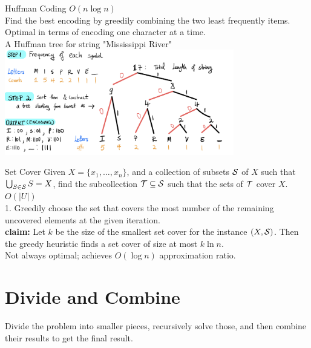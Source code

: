 \documentclass[10pt,a4paper]{article}
\begin{document}
\begin{multicols}{3}
\begin{textbox}{Huffman Coding}
      $O(n\log n)$ \\
    Find the best encoding by greedily combining the two least frequently items. Optimal in terms of encoding one character at a time.\\
    \linebreak
     A Huffman tree for string  "Mississippi River"\\
    \includegraphics[width=0.75\textwidth]{images/Huffman-coding.jpeg}
\end{textbox}

\begin{textbox}{Set Cover}
    Given $X = \{x_1,\ldots,x_n\}$, and a collection of subsets $\cal{S}$ of $X$ such
    that $\bigcup_{S \in \cal{S}} S = X$, find the subcollection $\cal{T} \subseteq \cal{S}$ such that the sets of
    $\cal{T}$ cover $X$.\\
    \linebreak
      $O(|U|)$ \\
    1. Greedily choose the set that covers the most number of the remaining uncovered elements at the given iteration.\\
    {\bf claim:} Let $k$ be the size of the smallest set cover for
    the instance $(X,\cal{S})$.  Then the greedy heuristic finds
    a set cover of size at most $k \ln n$.
    \linebreak
    \\Not always optimal; achieves $O(\log n)$ approximation ratio.
\end{textbox}

\section{Divide and Combine}

\begin{textbox}{}
 Divide the problem into smaller pieces, recursively solve those, and then combine their results to get the final result.\\
\end{textbox}


\end{multicols}
\end{document}
